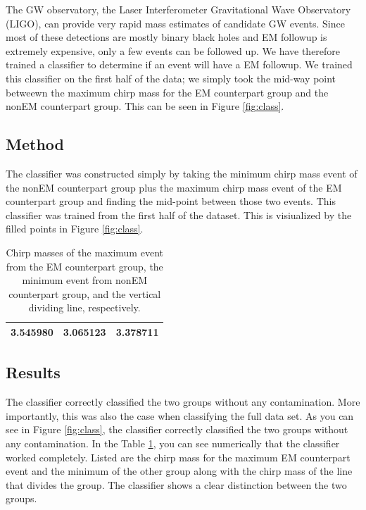 The GW observatory, the Laser Interferometer Gravitational Wave Observatory (LIGO), can provide very rapid mass estimates of candidate GW events. Since most of these detections are mostly binary black holes and EM followup is extremely expensive, only a few events can be followed up. We have therefore trained a classifier to determine if an event will have a EM followup. We trained this classifier on the first half of the data; we simply took the mid-way point betweewn the maximum chirp mass for the EM counterpart group and the nonEM counterpart group. This can be seen in Figure \ref{fig:class}.


\subsection{Method}
The classifier was constructed simply by taking the minimum chirp mass event of the nonEM counterpart group plus the maximum chirp mass event of the EM counterpart group and finding the mid-point between those two events. This classifier was trained from the first half of the dataset. This is visiualized by the filled points in Figure \ref{fig:class}.

\begin{table}[ht]
\caption{Chirp masses of the maximum event from the EM counterpart group, the minimum event from nonEM counterpart group, and the vertical dividing line, respectively.}
\centering
\begin{tabular}{c c c}
\hline\hline
3.545980 & 3.065123 & 3.378711\\
\hline\hline
\end{tabular}
\label{tab:mass}
\end{table}

\subsection{Results}
The classifier correctly classified the two groups without any contamination. More importantly, this was also the case when classifying the full data set. As you can see in Figure \ref{fig:class}, the classifier correctly classified the two groups without any contamination. In the Table \ref{tab:mass}, you can see numerically that the classifier worked completely. Listed are the chirp mass for the maximum EM counterpart event and the minimum of the other group along with the chirp mass of the line that divides the group. The classifier shows a clear distinction between the two groups.




